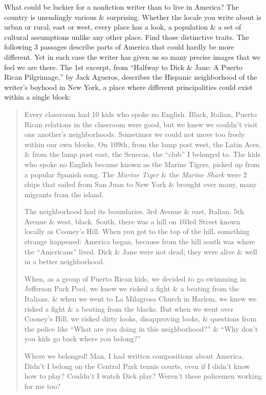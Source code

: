 \documentclass{article}
\begin{document}
What could be luckier for a nonfiction writer than to live in America? The country is unendingly various \& surprising. Whether the locale you write about is urban or rural, east or west, every place has a look, a population \& a set of cultural assumptions unlike any other place. Find those distinctive traits. The following 3 passages describe parts of America that could hardly be more different. Yet in each case the writer has given us so many precise images that we feel we are there. The 1st excerpt, from ``Halfway to Dick \& Jane: A Puerto Rican Pilgrimage,'' by Jack Agueros, describes the Hispanic neighborhood of the writer's boyhood in New York, a place where different principalities could exist within a single block:
\begin{quotation}
	Every classroom had 10 kids who spoke no English. Black, Italian, Puerto Rican relations in the classroom were good, but we knew we couldn't visit one another's neighborhoods. Sometimes we could not move too freely within our own blocks. On 109th, from the lamp post west, the Latin Aces, \& from the lamp post east, the Senecas, the ``club'' I belonged to. The kids who spoke no English became known as the Marine Tigers, picked up from a popular Spanish song. The \textit{Marine Tiger} \& the \textit{Marine Shark} were 2 ships that sailed from San Juan to New York \& brought over many, many migrants from the island.
	
	The neighborhood had its boundaries. 3rd Avenue \& east, Italian. 5th Avenue \& west, black. South, there was a hill on 103rd Street known locally as Cooney's Hill. When you got to the top of the hill, something strange happened: America began, because from the hill south was where the ``Americans'' lived. Dick \& Jane were not dead; they were alive \& well in a better neighborhood.
	
	When, as a group of Puerto Rican kids, we decided to go swimming in Jefferson Park Pool, we knew we risked a fight \& a beating from the Italians. \& when we went to La Milagrosa Church in Harlem, we knew we risked a fight \& a beating from the blacks. But when we went over Cooney's Hill, we risked dirty looks, disapproving looks, \& questions from the police like ``What are you doing in this neighborhood?'' \& ``Why don't you kids go back where you belong?''
	
	Where we belonged! Man, I had written compositions about America. Didn't I belong on the Central Park tennis courts, even if I didn't know how to play? Couldn't I watch Dick play? Weren't these policemen working for me too?
\end{quotation}
\end{document}
